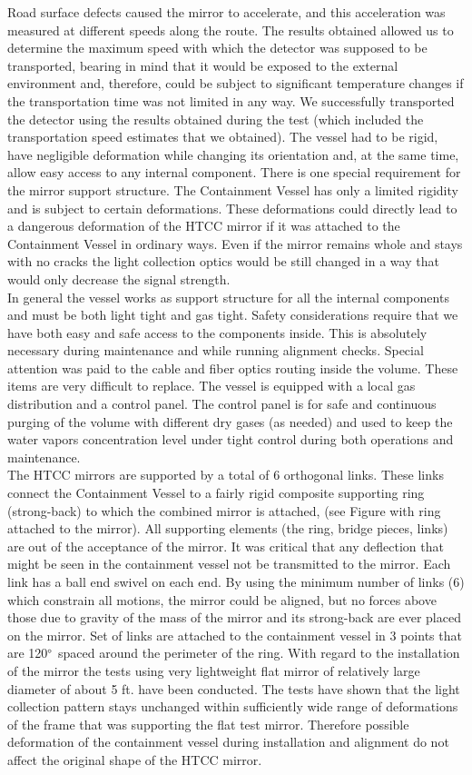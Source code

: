   Road surface defects caused the mirror to accelerate, and this acceleration was measured at different speeds along the route. The results obtained allowed us to determine the maximum speed with which the detector was supposed to be transported, bearing in mind that it would be exposed to the external environment and, therefore, could be subject to significant temperature changes if the transportation time was not limited in any way. We successfully transported the detector using the results obtained during the test (which included the transportation speed estimates that we obtained). The vessel had to be rigid, have negligible deformation while changing its orientation and, at the same time, allow easy access to any internal component. There is one special requirement for the mirror support structure. The Containment Vessel has only a limited rigidity and is subject to certain deformations. These deformations could directly lead to a dangerous deformation of the HTCC mirror if it was attached to the Containment Vessel in ordinary ways. Even if the mirror remains whole and stays with no cracks the light collection optics would be still changed in a way that would only decrease the signal strength.
\\
\indent In general the vessel works as support structure for all the internal components and must be both light tight and gas tight. Safety considerations require that we have both easy and safe access to the components inside. This is absolutely necessary during maintenance and while running alignment checks. Special attention was paid to the cable and fiber optics routing inside the volume. These items are very difficult to replace. The vessel is equipped with a local gas distribution and a control panel. The control panel is for safe and continuous purging of the volume with different dry gases (as needed) and used to keep the water vapors concentration level under tight control during both  operations and maintenance.
\\
\indent The HTCC mirrors are supported by a total of 6 orthogonal links. These links connect the Containment Vessel to a fairly rigid composite supporting ring (strong-back) to which the combined mirror is attached, (see Figure with ring attached to the mirror). All supporting elements (the ring, bridge pieces, links) are out of the acceptance of the mirror. It was critical that any deflection that might be seen in the containment vessel not be transmitted to the mirror. Each link has a ball end swivel on each end. By using the minimum number of links (6) which constrain all motions, the mirror could be aligned, but no forces above those due to gravity of the mass of the mirror and its strong-back are ever placed on the mirror. Set of links are attached to the containment vessel in 3 points that are 120$\degree$ spaced around the perimeter of the ring. With regard to the installation of the mirror the tests using very lightweight flat mirror of relatively large diameter of about 5 ft. have been conducted. The tests have shown that the light collection pattern stays unchanged within sufficiently wide range of deformations of the frame that was supporting the flat test mirror. Therefore possible deformation of the containment vessel during installation and alignment do not affect the original shape of the HTCC mirror.

